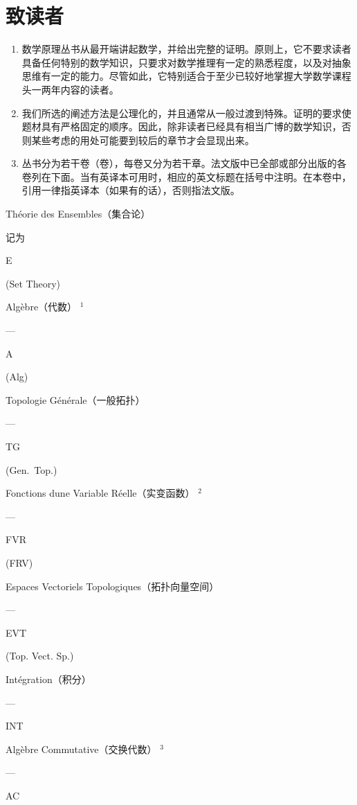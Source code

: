 \chapter*{致读者}
{}

\begin{enumerate}
\def\labelenumi{\arabic{enumi}.}
\item
  数学原理丛书从最开端讲起数学，并给出完整的证明。原则上，它不要求读者具备任何特别的数学知识，只要求对数学推理有一定的熟悉程度，以及对抽象思维有一定的能力。尽管如此，它特别适合于至少已较好地掌握大学数学课程头一两年内容的读者。
\item
  我们所选的阐述方法是公理化的，并且通常从一般过渡到特殊。证明的要求使题材具有严格固定的顺序。因此，除非读者已经具有相当广博的数学知识，否则某些考虑的用处可能要到较后的章节才会显现出来。
\item
  丛书分为若干卷（卷），每卷又分为若干章。法文版中已全部或部分出版的各卷列在下面。当有英译本可用时，相应的英文标题在括号中注明。在本卷中，引用一律指英译本（如果有的话），否则指法文版。
\end{enumerate}

Théorie des Ensembles（集合论）

记为

E

(Set Theory)

Algèbre（代数） \(^{1}\)

---

A

(Alg)

Topologie Générale（一般拓扑）

---

TG

(Gen.~Top.)

Fonctions d\textquotesingle une Variable Réelle（实变函数） \(^{2}\)

---

FVR

(FRV)

Espaces Vectoriels Topologiques（拓扑向量空间）

---

EVT

(Top. Vect. Sp.)

Intégration（积分）

---

INT

Algèbre Commutative（交换代数） \(^{3}\)

---

AC

